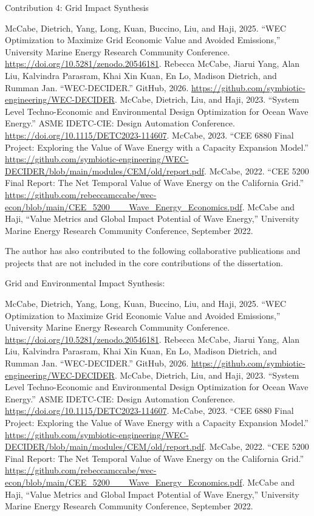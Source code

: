 \newcommand{\contributionsDecider}{%
\begin{typedlist}
    \titem{c} McCabe, Dietrich, Yang, Long, Kuan, Buccino, Liu, and Haji, 2025. ``WEC Optimization to Maximize Grid Economic Value and Avoided Emissions,'' University Marine Energy Research Community Conference. \url{https://doi.org/10.5281/zenodo.20546181}.
    \titem{o} Rebecca McCabe, Jiarui Yang, Alan Liu, Kalvindra Parasram, Khai Xin Kuan, En Lo, Madison Dietrich, and Rumman Jan. ``WEC-DECIDER.'' GitHub, 2026. \url{https://github.com/symbiotic-engineering/WEC-DECIDER}.
    \titem{c} McCabe, Dietrich, Liu, and Haji, 2023. ``System Level Techno-Economic and Environmental Design Optimization for Ocean Wave Energy.'' ASME IDETC-CIE: Design Automation Conference. \url{https://doi.org/10.1115/DETC2023-114607}.
    \titem{r} McCabe, 2023. ``CEE 6880 Final Project: Exploring the Value of Wave Energy with a Capacity Expansion Model.'' \url{https://github.com/symbiotic-engineering/WEC-DECIDER/blob/main/modules/CEM/old/report.pdf}.
    \titem{r} McCabe, 2022. ``CEE 5200 Final Report: The Net Temporal Value of Wave Energy on the California Grid.'' \url{https://github.com/rebeccamccabe/wec-econ/blob/main/CEE_5200___Wave_Energy_Economics.pdf}.
    \titem{p} McCabe and Haji, ``Value Metrics and Global Impact Potential of Wave Energy,'' University Marine Energy Research Community Conference, September 2022.
\end{typedlist}
}
\ifdefined\DECIDER
  \noindent
  Contribution 4: Grid Impact Synthesis
  \contributionsDecider
\fi

The author has also contributed to the following collaborative publications and projects that are not included in the core contributions of the dissertation.

\ifdefined\DECIDER
\else
  \noindent
  Grid and Environmental Impact Synthesis:
  \contributionsDecider
\fi

